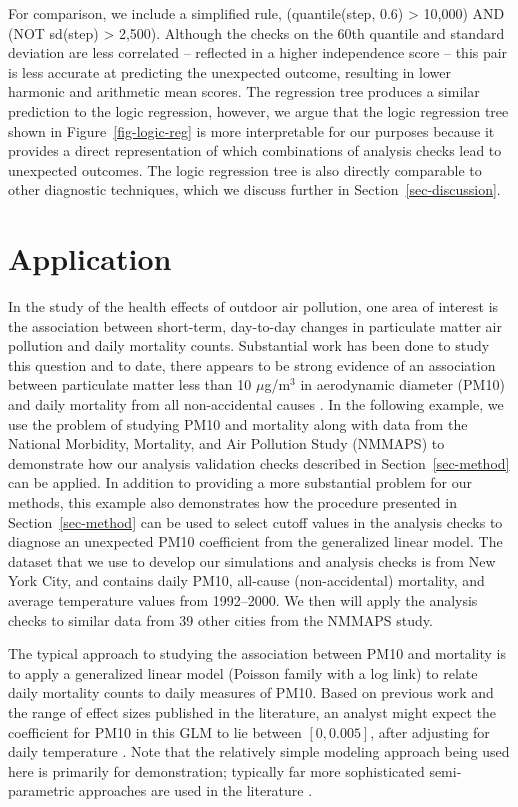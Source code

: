 \documentclass[
  12pt,
]{interact}
\begin{document}
For comparison, we include a simplified rule, (quantile(step, 0.6)
\textgreater{} 10,000) AND (NOT sd(step) \textgreater{} 2,500). Although
the checks on the 60th quantile and standard deviation are less
correlated -- reflected in a higher independence score -- this pair is
less accurate at predicting the unexpected outcome, resulting in lower
harmonic and arithmetic mean scores. The regression tree produces a
similar prediction to the logic regression, however, we argue that the
logic regression tree shown in Figure~\ref{fig-logic-reg} is more
interpretable for our purposes because it provides a direct
representation of which combinations of analysis checks lead to
unexpected outcomes. The logic regression tree is also directly
comparable to other diagnostic techniques, which we discuss further in
Section~\ref{sec-discussion}.

\section{Application}\label{sec-pm10-mortality}

In the study of the health effects of outdoor air pollution, one area of
interest is the association between short-term, day-to-day changes in
particulate matter air pollution and daily mortality counts. Substantial
work has been done to study this question and to date, there appears to
be strong evidence of an association between particulate matter less
than 10 \(\mu\)g/m\(^3\) in aerodynamic diameter (PM10) and daily
mortality from all non-accidental causes \citep{samet2000fine}. In the
following example, we use the problem of studying PM10 and mortality
along with data from the National Morbidity, Mortality, and Air
Pollution Study (NMMAPS) to demonstrate how our analysis validation
checks described in Section~\ref{sec-method} can be applied. In addition
to providing a more substantial problem for our methods, this example
also demonstrates how the procedure presented in
Section~\ref{sec-method} can be used to select cutoff values in the
analysis checks to diagnose an unexpected PM10 coefficient from the
generalized linear model. The dataset that we use to develop our
simulations and analysis checks is from New York City, and contains
daily PM10, all-cause (non-accidental) mortality, and average
temperature values from 1992--2000. We then will apply the analysis
checks to similar data from 39 other cities from the NMMAPS study.

The typical approach to studying the association between PM10 and
mortality is to apply a generalized linear model (Poisson family with a
log link) to relate daily mortality counts to daily measures of PM10.
Based on previous work and the range of effect sizes published in the
literature, an analyst might expect the coefficient for PM10 in this GLM
to lie between \([0, 0.005]\), after adjusting for daily temperature
\citep{samet2000fine, welty2005acute}. Note that the relatively simple
modeling approach being used here is primarily for demonstration;
typically far more sophisticated semi-parametric approaches are used in
the literature \citep{peng2006model}.
\end{document}
